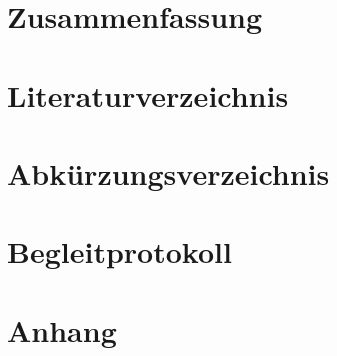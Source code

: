 \documentclass[12pt]{scrreprt}
\begin{document}
	
	\pagebreak
	
	\chapter{Zusammenfassung}
	\pagebreak
	
	\chapter{Literaturverzeichnis}
	\pagebreak
	
	\listoffigures
	\pagebreak
	
	\chapter{Abkürzungsverzeichnis}
	\pagebreak
	
	\chapter{Begleitprotokoll}
	
	\chapter{Anhang}
	
	

	
\end{document}
